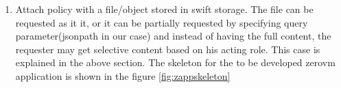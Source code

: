 \begin{enumerate}

  \item Attach policy with a file/object stored in swift storage. The  file can be requested as it it, or it can be partially requested by specifying query parameter(jsonpath in our case) and instead of having the full content, the requester may get selective content based on his acting role. This case is explained in the above section. The skeleton for the to be developed zerovm application is shown in the figure \ref{fig:zappskeleton}



\end{enumerate}









